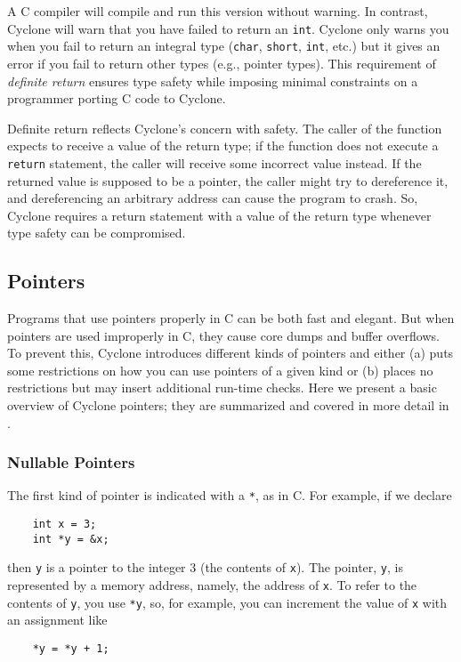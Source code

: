 A C compiler will compile and run this version without warning.  
In contrast, Cyclone will warn that you have failed to return
an \texttt{int}.  Cyclone only warns you when you fail to return
an integral type (\texttt{char}, \texttt{short}, \texttt{int}, etc.) 
but it gives an error if you fail to return
other types (e.g., pointer types).  This requirement of
\emph{definite return} ensures type safety while imposing
minimal constraints on a programmer porting C code to Cyclone.

Definite return reflects Cyclone's concern with safety.  The caller of
the function expects to receive a value of the return type; if the
function does not execute a \texttt{return} statement, the caller will
receive some incorrect value instead.  If the returned value is supposed
to be a pointer, the caller might try to dereference it, and
dereferencing an arbitrary address can cause the program to crash.  So,
Cyclone requires a return statement with a value of the return
type whenever type safety can be compromised.  

\subsection{Pointers}

Programs that use pointers properly in C can be both fast and elegant.
But when pointers are used improperly in C, they cause core dumps and
buffer overflows.  To prevent this, Cyclone introduces different kinds
of pointers and either (a) puts some restrictions on how you can use pointers
of a given kind or (b) places no restrictions but may insert additional
run-time checks.  Here we present a basic overview of Cyclone
pointers; they are summarized and covered in more detail in
.

\subsubsection*{Nullable Pointers}

The first kind of pointer is indicated with a \texttt{*}, as in C\@.  For
example, if we declare
\begin{verbatim}
    int x = 3;
    int *y = &x;
\end{verbatim}
then \texttt{y} is a pointer to the integer 3 (the contents of
\texttt{x}).  The pointer, \texttt{y}, is represented by a memory
address, namely, the address of \texttt{x}.  To refer to the contents
of \texttt{y}, you use \texttt{*y}, so, for example, you can increment
the value of \texttt{x} with an assignment like
\begin{verbatim}
    *y = *y + 1;
\end{verbatim}

